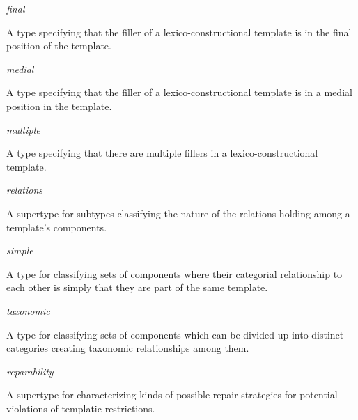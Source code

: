 \begin{ontologytop}
\begin{classlist}
		\begin{classlist}

		\item \emph{final}
		\hspace{1em}\parbox[t]{\linegoal}{\footnotesize A type specifying that the filler of a lexico-constructional template is in the final position of the template.}


		\item \emph{medial}
		\hspace{1em}\parbox[t]{\linegoal}{\footnotesize A type specifying that the filler of a lexico-constructional template is in a medial position in the template.}


		\item \emph{multiple}
		\hspace{1em}\parbox[t]{\linegoal}{\footnotesize A type specifying that there are multiple fillers in a lexico-constructional template.}


		\end{classlist}

	\end{classlist}

\item \emph{relations}
\hspace{1em}\parbox[t]{\linegoal}{\footnotesize A supertype for subtypes classifying the nature of the relations holding among a template's components.}


	\begin{classlist}

	\item \emph{simple}
	\hspace{1em}\parbox[t]{\linegoal}{\footnotesize A type for classifying sets of components where their categorial relationship to each other is simply that they are part of the same template.}


	\item \emph{taxonomic}
	\hspace{1em}\parbox[t]{\linegoal}{\footnotesize A type for classifying sets of components which can be divided up into distinct categories creating taxonomic relationships among them.}


	\end{classlist}

\item \emph{reparability}
\hspace{1em}\parbox[t]{\linegoal}{\footnotesize A supertype for characterizing kinds of possible repair strategies for potential violations of templatic restrictions.}



\end{ontologytop}
